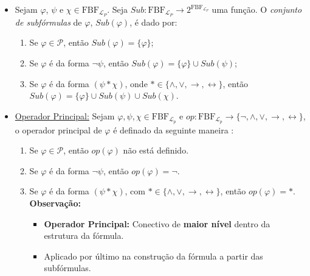 \begin{itemize}[left=0.5cm, align=left, nosep]
            \item Sejam $\varphi$, $\psi$ e $\chi \in \text{FBF}_{\mathcal{L}_P}$. Seja $Sub : \text{FBF}_{\mathcal{L}_P} 
            \rightarrow 2^{\text{FBF}_{\mathcal{L}_P}}$ uma função. O \textit{conjunto de subfórmulas} de $\varphi$, 
            $Sub(\varphi)$, é dado por:
            \begin{enumerate}[left=0.5cm, align=left, nosep]
                \item Se $\varphi \in \mathcal{P}$, então $Sub(\varphi) = \{\varphi\}$;
                \item Se $\varphi$ é da forma $\neg \psi$, então $Sub(\varphi) = \{\varphi\} \cup Sub(\psi)$;
                \item Se $\varphi$ é da forma $(\psi * \chi)$, onde $* \in \{\wedge, \vee, \rightarrow, \leftrightarrow\}$, então
                $Sub(\varphi) = \{\varphi\} \cup Sub(\psi) \cup Sub(\chi)$.
            \end{enumerate}
        
            \item \underline{Operador Principal:} Sejam $\varphi,\psi,\chi \in \mathrm{FBF}_{\mathcal{L}_p}$ e $op: \mathrm{FBF}_{\mathcal{L}_p}
            \rightarrow \{ \neg, \land, \vee, \rightarrow ,\leftrightarrow \}$, o operador principal de $\varphi$ é definado 
            da seguinte maneira : 

            \begin{enumerate}[left=0.5cm, align=left, nosep]
                \item Se $\varphi \in \mathcal{P}$, então $op(\varphi)$ não está definido.
                \item Se $\varphi$ é da forma $\neg \psi$, então $op(\varphi) = \neg$.
                \item Se $\varphi$ é da forma $(\psi * \chi)$, com $* \in \{\wedge, \vee, \rightarrow, \leftrightarrow\}$, então 
                $op(\varphi) = *$. \\
                \textbf{Observação:}
                \begin{itemize}[left=0.5cm, nosep, label=$\hookrightarrow$]
                    \item \textbf{Operador Principal:} Conectivo de \textbf{maior nível} dentro da estrutura da fórmula. 
                    \item Aplicado por último na construção da fórmula a partir das subfórmulas.
                \end{itemize} 
            \end{enumerate}


\end{itemize}
